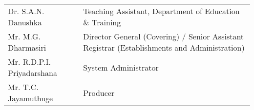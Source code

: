 \begin{longtable}{ L{4.8cm}  L{6.5cm} }
    Dr. S.A.N. Danushka & Teaching Assistant, Department of Education \& Training \\
    Mr. M.G. Dharmasiri & Director General (Covering) / Senior Assistant Registrar (Establishments and Administration) \\
    Mr. R.D.P.I. Priyadarshana & System Administrator \\
    Mr. T.C. Jayamuthuge & Producer \\
       
        
\end{longtable}    
\newpage
\singlespacing